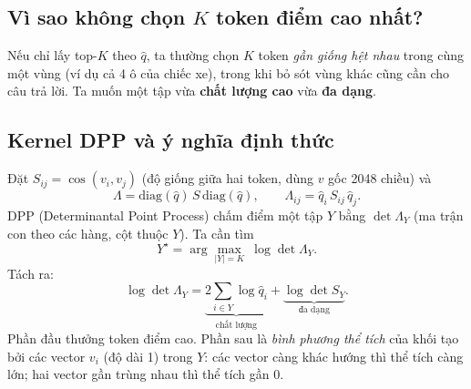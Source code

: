 \documentclass[11pt,a4paper]{article}
\newcommand{\qhat}{\hat{q}}
\begin{document}
\subsection{Vì sao không chọn $K$ token điểm cao nhất?}
Nếu chỉ lấy top-$K$ theo $\qhat$, ta thường chọn $K$ token \emph{gần giống hệt nhau} trong cùng một vùng (ví dụ cả 4 ô của chiếc xe), trong khi bỏ sót vùng khác cũng cần cho câu trả lời. Ta muốn một tập vừa \textbf{chất lượng cao} vừa \textbf{đa dạng}.

\subsection{Kernel DPP và ý nghĩa định thức}
Đặt $S_{ij}=\cos(v_i,v_j)$ (độ giống giữa hai token, dùng $v$ gốc 2048 chiều) và
\begin{equation}
\Lambda=\mathrm{diag}(\qhat)\,S\,\mathrm{diag}(\qhat),\qquad \Lambda_{ij}=\qhat_i\,S_{ij}\,\qhat_j.
\end{equation}
DPP (Determinantal Point Process) chấm điểm một tập $Y$ bằng $\det\Lambda_Y$ (ma trận con theo các hàng, cột thuộc $Y$). Ta cần tìm
\begin{equation}
Y^\star=\arg\max_{|Y|=K}\ \log\det\Lambda_Y.
\end{equation}
Tách ra:
\begin{equation}
\log\det\Lambda_Y=\underbrace{2\sum_{i\in Y}\log\qhat_i}_{\text{chất lượng}}+\underbrace{\log\det S_Y}_{\text{đa dạng}}.
\end{equation}
Phần đầu thưởng token điểm cao. Phần sau là \emph{bình phương thể tích} của khối tạo bởi các vector $v_i$ (độ dài 1) trong $Y$: các vector càng khác hướng thì thể tích càng lớn; hai vector gần trùng nhau thì thể tích gần 0.
\end{document}
